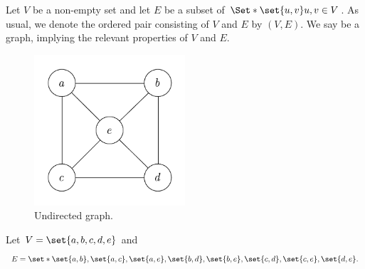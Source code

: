 
Let $V$ be a non-empty set and let $E$ be a subset of $\Set*{\set{u, v}}{u, v \in V}$.
As usual, we denote the ordered pair consisting of $V$ and $E$ by $(V, E)$.
We say  be a graph, implying the relevant properties of $V$ and $E$.


\begin{figure}
  \centering
  \includegraphics[width=0.5\textwidth]{graphics_included/undirected_graph}
  \caption{Undirected graph.}
\end{figure}

Let $V = \set{a, b, c, d, e}$
and
$$
  E = \set*{\set{a, b}, \set{a, c}, \set{a, e}, \set{b, d}, \set{b, e}, \set{c, d}, \set{c, e}, \set{d,e}}.
$$
\strats
